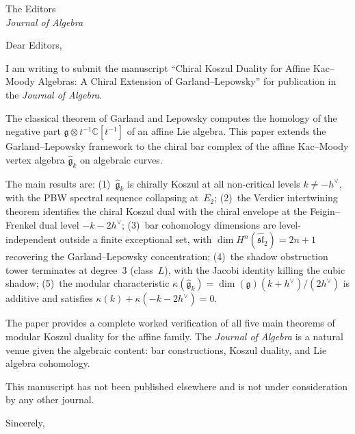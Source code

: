 \documentclass[11pt]{letter}
\date{\today}
\begin{document}
\begin{letter}{The Editors\\
\emph{Journal of Algebra}}

\opening{Dear Editors,}

I am writing to submit the manuscript ``Chiral Koszul Duality for
Affine Kac--Moody Algebras: A Chiral Extension of Garland--Lepowsky''
for publication in the \emph{Journal of Algebra}.

The classical theorem of Garland and Lepowsky computes the
homology of the negative part
$\mathfrak{g} \otimes t^{-1}\mathbb{C}[t^{-1}]$ of an affine Lie
algebra. This paper extends the Garland--Lepowsky framework to
the chiral bar complex of the affine Kac--Moody vertex algebra
$\widehat{\mathfrak{g}}_k$ on algebraic curves.

The main results are: (1)~$\widehat{\mathfrak{g}}_k$ is chirally
Koszul at all non-critical levels $k \neq -h^\vee$, with the PBW
spectral sequence collapsing at~$E_2$;
(2)~the Verdier intertwining theorem identifies the chiral Koszul
dual with the chiral envelope at the Feigin--Frenkel dual level
$-k - 2h^\vee$; (3)~bar cohomology dimensions are
level-independent outside a finite exceptional set, with
$\dim H^n(\widehat{\mathfrak{sl}}_2) = 2n{+}1$ recovering the
Garland--Lepowsky concentration; (4)~the shadow obstruction tower
terminates at degree~$3$ (class~$L$), with the Jacobi identity
killing the cubic shadow; (5)~the modular characteristic
$\kappa(\widehat{\mathfrak{g}}_k) =
\dim(\mathfrak{g})(k{+}h^\vee)/(2h^\vee)$ is additive and
satisfies $\kappa(k) + \kappa(-k{-}2h^\vee) = 0$.

The paper provides a complete worked verification of all five main
theorems of modular Koszul duality for the affine family. The
\emph{Journal of Algebra} is a natural venue given the algebraic
content: bar constructions, Koszul duality, and Lie algebra
cohomology.

This manuscript has not been published elsewhere and is not under
consideration by any other journal.

\closing{Sincerely,}

\end{letter}
\end{document}
